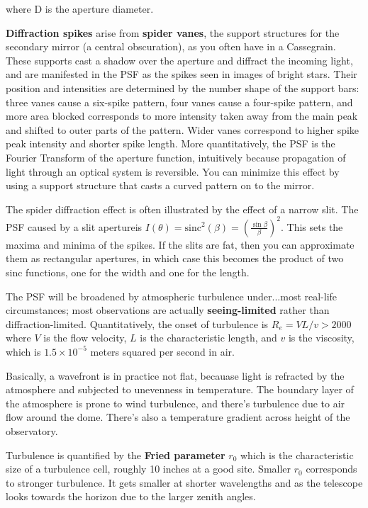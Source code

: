 \documentclass[12pt, letterpaper, preprint]{aastex}
\begin{document}
\begin{enumerate}
where D is the aperture diameter. 

\textbf{Diffraction spikes} arise from \textbf{spider vanes},
the support structures for the secondary mirror (a central obscuration), as you often have in a Cassegrain. These supports cast a shadow over the aperture and diffract the incoming light, and are manifested in the PSF as the spikes seen in images of bright stars.
Their position and intensities are determined by the number shape of the support bars: three vanes cause a six-spike pattern, four vanes cause a four-spike pattern,
and more area blocked corresponds to more intensity taken away from the main peak and shifted to outer parts of the pattern.
Wider vanes correspond to higher spike peak intensity and shorter spike length.
More quantitatively, the PSF is the Fourier Transform of the aperture function, intuitively because propagation of light through an optical system is reversible.
You can minimize this effect by using a support structure that casts a curved pattern on to the mirror. 

The spider diffraction effect is often illustrated by the effect of a narrow slit. The PSF caused by a slit apertureis $I(\theta) = \textrm{sinc}^2 (\beta) = \left( \frac{\sin \beta}{\beta} \right)^2 $. This sets the maxima and minima of the spikes. If the slits are fat, then you can approximate them as rectangular apertures, in which case this becomes the product of two sinc functions, one for the width and one for the length.

The PSF will be broadened by atmospheric turbulence under...most real-life circumstances; most observations are actually \textbf{seeing-limited} rather than diffraction-limited. 
Quantitatively, the onset of turbulence is $R_e = VL/v > 2000$ where
$V$ is the flow velocity, $L$ is the characteristic length, and $v$ is the viscosity, which is $1.5 \times 10^{-5}$ meters squared per second in air.

Basically, a wavefront is in practice not flat, becauase
light is refracted by the atmosphere and subjected to unevenness in temperature.
The boundary layer of the atmosphere is prone to wind turbulence, and there's turbulence due to air flow around the dome. There's also
a temperature gradient across height of the observatory. 

Turbulence is quantified by the \textbf{Fried parameter} $r_0$ which is the characteristic size of a turbulence cell, roughly 10 inches at a good site. Smaller $r_0$ corresponds to stronger turbulence. It gets smaller at shorter wavelengths and as the telescope looks towards the horizon due to the larger zenith angles. 


\end{enumerate}
\end{document}
